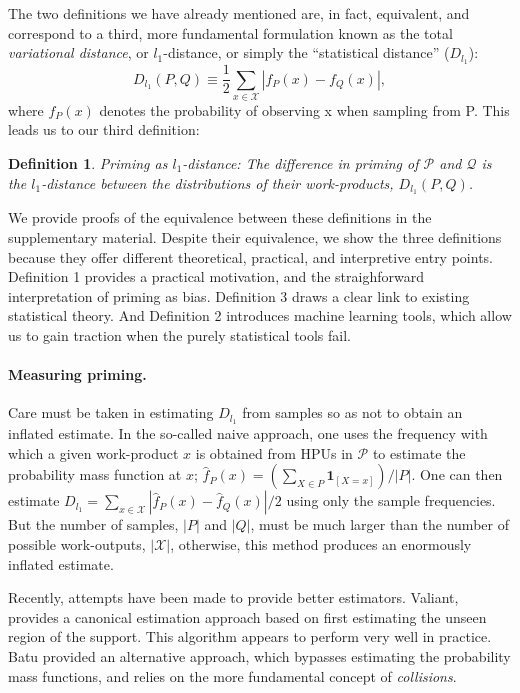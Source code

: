 \documentclass[12pt]{article}
\newtheorem*{mydef}{Definition}
\begin{document}
The two definitions we have already mentioned are, in fact, equivalent, and 
correspond to a third, more fundamental formulation known as the total 
\textit{variational distance}, or $l_1$-distance, or simply the “statistical 
distance” ($D_{l_1}$):
$$
	D_{l_1}(P,Q) \equiv \frac{1}{2} \sum_{x \in \mathcal{X}} 
	\left| 
		f_P(x) - f_Q(x)
	\right|,
$$
where $f_P(x)$ denotes the probability of observing x when sampling from P. 
This leads us to our third definition:

\begin{mydef}
	{\upshape Priming as $l_1$-distance:}
	The difference in priming of $\mathcal{P}$ and $\mathcal{Q}$ is the 
	$l_1$-distance between the distributions of their work-products, 
	$D_{l_1}(P,Q)$.
\end{mydef}

We provide proofs of the equivalence between these definitions in the 
supplementary material. Despite their equivalence, we show the three 
definitions because they offer different theoretical, practical, and 
interpretive entry points. Definition 1 provides a practical motivation, and 
the straighforward interpretation of priming as bias. Definition 3 draws a 
clear link to existing statistical theory. And Definition 2 introduces machine 
learning tools, which allow us to gain traction when the purely statistical 
tools fail.

\paragraph{Measuring priming.}
Care must be taken in estimating $D_{l_1}$ from samples so as not to obtain
an inflated estimate. In the so-called naive approach, one uses the frequency 
with which a given work-product $x$ is obtained from HPUs in $\mathcal{P}$ to 
estimate the probability mass function at $x$; 
$\hat{f}_P(x) = (\sum_{X\in P} \mathbf{1}_{[X=x]})/|P|$.
One can then estimate 
$D_{l_1} = \sum_{x \in \mathcal{X}} \left|\hat{f}_P(x) - \hat{f}_Q(x) \right|/2$ using only the sample frequencies. But the number of samples, $|P|$ and 
$|Q|$, must be much larger than the number of possible work-outputs, 
$|\mathcal{X}|$, otherwise, this method produces an enormously inflated 
estimate.

Recently, attempts have been made to provide better estimators. Valiant, 
provides a canonical estimation approach based on first estimating the unseen 
region of the support. This algorithm appears to perform very well in practice.
Batu provided an alternative approach, which bypasses estimating the 
probability mass functions, and relies on the more fundamental concept of 
\textit{collisions}.
\end{document}

